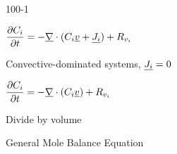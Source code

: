 \begin{mitframe}{100-1}
 \begin{listone}
	\item $\dfrac{\partial\conc_{\state}}{\partial\timet}=-\gradop\cdot(\conc_{\state}\uline{\vvel}+\uline{\molspecflux})+\gasconst_{\vvel_{\state}}$
    
    		\begin{listthree}
            	\item Convective-dominated systems, $\uline{\molspecflux}=0$
                    \begin{listfour}
                    		\item  $\dfrac{\partial\conc_{\state}}{\partial\timet}=-\gradop\cdot(\conc_{\state}\uline{\vvel})+\gasconst_{\vvel_{\state}}$
                            \item Divide by volume
                            	\begin{listfive}
                                	\item General Mole Balance Equation
                                \end{listfive}
                    \end{listfour}
            \end{listthree}
\end{listone}   
\end{mitframe}